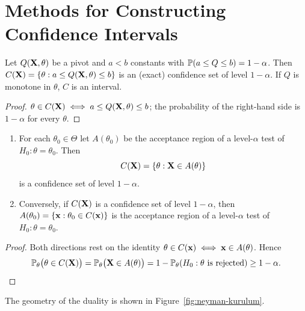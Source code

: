 \documentclass[main.tex]{subfiles}
\begin{document}
\section{Methods for Constructing Confidence Intervals}

\begin{theorem}\label{thm:pivot}
Let $Q(\X,\theta)$ be a pivot and $a<b$ constants with $\P(a\le Q\le b)=1-\alpha$. Then $C(\X)=\{\theta: a\le Q(\X,\theta)\le b\}$ is an (exact) confidence set of level $1-\alpha$. If $Q$ is monotone in $\theta$, $C$ is an interval.
\end{theorem}
\begin{proof}
$\theta\in C(\X)\iff a\le Q(\X,\theta)\le b$; the probability of the right-hand side is $1-\alpha$ for every $\theta$.
\end{proof}

\begin{theorem}\label{thm:dualite}
\begin{enumerate}
  \item For each $\theta_0\in\Theta$ let $A(\theta_0)$ be the acceptance region of a level-$\alpha$ test of $H_0:\theta=\theta_0$. Then
  \[
  C(\X) = \{\theta : \X \in A(\theta)\}
  \]
  is a confidence set of level $1-\alpha$.
  \item Conversely, if $C(\X)$ is a confidence set of level $1-\alpha$, then $A(\theta_0)=\{\x:\theta_0\in C(\x)\}$ is the acceptance region of a level-$\alpha$ test of $H_0:\theta=\theta_0$.
\end{enumerate}
\end{theorem}
\begin{proof}
Both directions rest on the identity $\theta\in C(\x)\iff\x\in A(\theta)$. Hence
\[
\P_\theta\big(\theta\in C(\X)\big)=\P_\theta\big(\X\in A(\theta)\big)=1-\P_\theta(H_0:\theta\text{ is rejected})\ge1-\alpha .\qedhere
\]
\end{proof}

The geometry of the duality is shown in Figure~\ref{fig:neyman-kurulum}.
\end{document}
